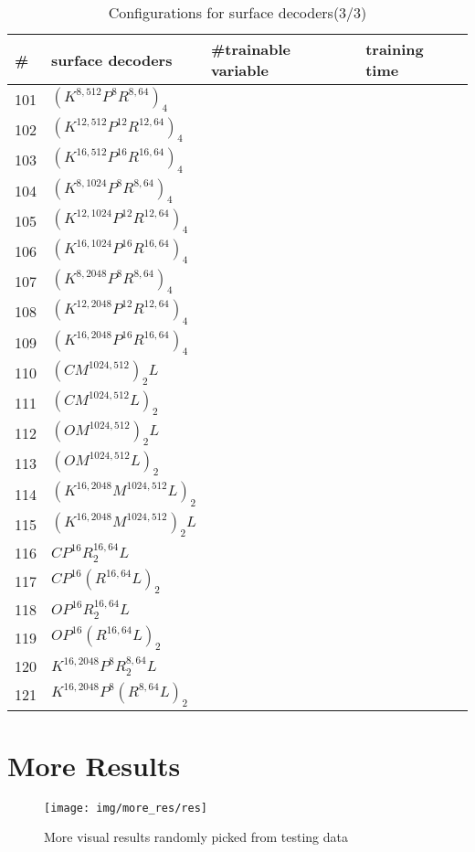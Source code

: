 \begin{appendices}
\begin{table*}
\begin{tabular}{|l | l | l | l }
	\end{tabular}
\end{table*}
\begin{table*}
	\caption{Configurations for surface decoders(3/3)}
	\label{tab:surf_dec3}
	\centering
	\begin{tabular}{| l | l | l | l}
		\hline
		\hline
		\#&surface decoders & \#trainable variable & training time \\
		\hline
		101&$(K^{8,512}P^{8}R^{8,64})_4$ &~&~\\
		102&$(K^{12,512}P^{12}R^{12,64})_4$ &~&~\\
		103&$(K^{16,512}P^{16}R^{16,64})_4$ &~&~\\
		104&$(K^{8,1024}P^{8}R^{8,64})_4$ &~&~\\
		105&$(K^{12,1024}P^{12}R^{12,64})_4$ &~&~\\
		106&$(K^{16,1024}P^{16}R^{16,64})_4$ &~&~\\
		107&$(K^{8,2048}P^{8}R^{8,64})_4$ &~&~\\
		108&$(K^{12,2048}P^{12}R^{12,64})_4$ &~&~\\
		109&$(K^{16,2048}P^{16}R^{16,64})_4$ &~&~\\
		\hline
		110&$(CM^{1024,512})_2L$ &~&~\\
		111&$(CM^{1024,512}L)_2$ &~&~\\
		112&$(OM^{1024,512})_2L$ &~&~\\
		113&$(OM^{1024,512}L)_2$ &~&~\\
		114&$(K^{16,2048}M^{1024,512}L)_2$ &~&~\\
		115&$(K^{16,2048}M^{1024,512})_2L$ &~&~\\
		116&$CP^{16}R^{16,64}_2L$ &~&~\\
		117&$CP^{16}(R^{16,64}L)_2$ &~&~\\
		118&$OP^{16}R^{16,64}_2L$ &~&~\\
		119&$OP^{16}(R^{16,64}L)_2$ &~&~\\
		120&$K^{16,2048}P^{8}R^{8,64}_2L$ &~&~\\
		121&$K^{16,2048}P^{8}(R^{8,64}L)_2$ &~&~\\

	\end{tabular}
\end{table*}
\newpage
\newpage
\section{More Results}
\begin{figure*}[htbp]
	\centering
	\texttt{[image: img/more\_res/res]}
	\caption{More visual results randomly picked from testing data}
	\label{fig:more_res}
\end{figure*}
\end{appendices}